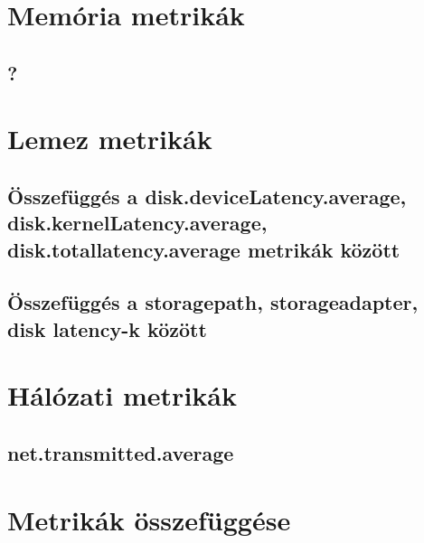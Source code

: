 \documentclass[a4paper,10pt,titlepage]{article}
\begin{document}
\section{Memória metrikák}
\subsection{?}

\section{Lemez metrikák}
\subsection{Összefüggés a disk.deviceLatency.average, disk.kernelLatency.average, \\ disk.totallatency.average metrikák között}
\subsection{Összefüggés a storagepath, storageadapter, disk latency-k között}

\section{Hálózati metrikák}
\subsection{net.transmitted.average}

\section{Metrikák összefüggése}
\end{document}
